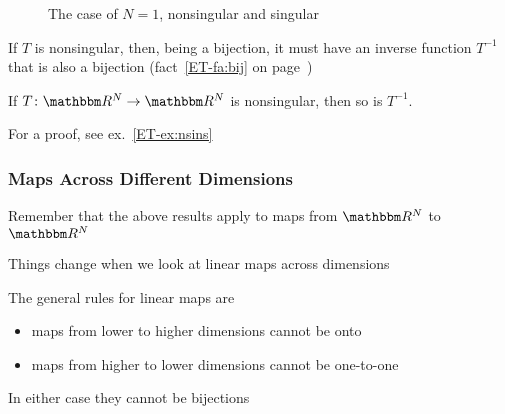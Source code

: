 \begin{frame}

    \begin{figure}
       \begin{center}
        \caption{The case of $N=1$, nonsingular and singular}
       \end{center}
    \end{figure}
    
\end{frame}

\begin{frame}
    
    \vspace{2em}
    If $T$ is nonsingular, then, being a bijection, it must have an inverse
    function $T^{-1}$ that is also a bijection (fact~\ref{ET-fa:bij} on
    page~\pageref{ET-fa:bij})

    \vspace{.7em}
    \Fact{\eqref{ET-fa:nsins}}
        If $T \colon \RR^N \to \RR^N$ is nonsingular, then so is $T^{-1}$.  

    For a proof, see ex.~\ref{ET-ex:nsins}
    
\end{frame}

\begin{frame}

    \frametitle{Maps Across Different Dimensions} 

    \vspace{2em}
    Remember that the above results apply to maps from $\RR^N$ to $\RR^N$

    Things change when we look at linear maps across dimensions

    \vspace{.7em}

    The general rules for linear maps are 

    \begin{itemize}
        \item maps from lower to higher dimensions cannot be onto
        \item maps from higher to lower dimensions cannot be one-to-one
    \end{itemize}

    In either case they cannot be bijections

    \vspace{1em}

\end{frame}

